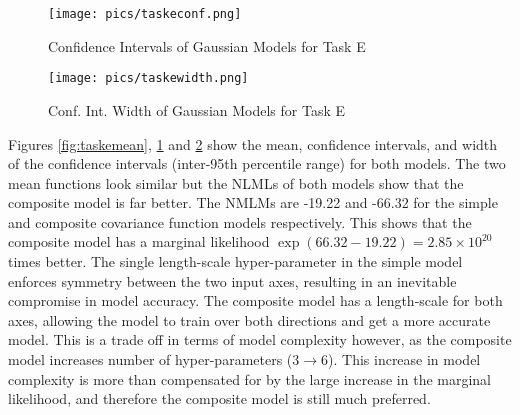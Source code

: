 \documentclass[11pt]{amsart}
\begin{document}
\begin{figure}[]
    \centering
    \texttt{[image: pics/taskeconf.png]}
    \caption{Confidence Intervals of Gaussian Models for Task E}
    \label{fig:taskeconf}
\end{figure}

\begin{figure}[]
    \centering
    \texttt{[image: pics/taskewidth.png]}
    \caption{Conf. Int. Width of Gaussian Models for Task E}
    \label{fig:taskewidth}
\end{figure}


Figures \ref{fig:taskemean}, \ref{fig:taskeconf} and \ref{fig:taskewidth} show the mean, confidence intervals, and width of the confidence intervals (inter-95th percentile range) for both models. The two mean functions look similar but the NLMLs of both models show that the composite model is far better. The NMLMs are -19.22 and -66.32 for the simple and composite covariance function models respectively. This shows that the composite model has a marginal likelihood $\exp(66.32-19.22) =2.85\times10^{20}$ times better. The single length-scale hyper-parameter in the simple model enforces symmetry between the two input axes, resulting in an inevitable compromise in model accuracy. The composite model has a length-scale for both axes, allowing the model to train over both directions and get a more accurate model. This is a trade off in terms of model complexity however, as the composite model increases number of hyper-parameters ($3\rightarrow6$). This increase in model complexity is more than compensated for by the large increase in the marginal likelihood, and therefore the composite model is still much preferred. 












\end{document}
